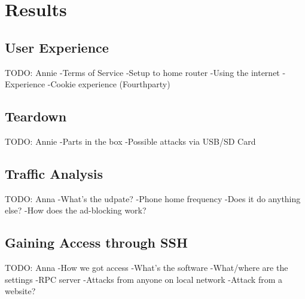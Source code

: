 \section{Results}
\label{sec:results}
\subsection{User Experience}
TODO: Annie
    -Terms of Service
    -Setup to home router
    -Using the internet
    -Experience
    -Cookie experience (Fourthparty)

\subsection{Teardown}
TODO: Annie
    -Parts in the box
    -Possible attacks via USB/SD Card

\subsection{Traffic Analysis}
TODO: Anna
    -What's the udpate?
    -Phone home frequency
    -Does it do anything else?
    -How does the ad-blocking work?

\subsection{Gaining Access through SSH}
TODO: Anna
    -How we got access
    -What's the software
    -What/where are the settings
    -RPC server
        -Attacks from anyone on local network
        -Attack from a website?
